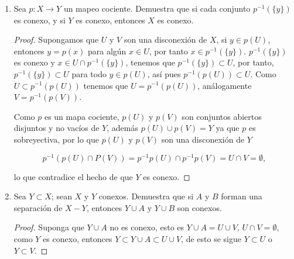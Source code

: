 \documentclass[11pt]{article}
\begin{document}
\begin{enumerate}
\begin{enumerate}
\begin{proof}
        \end{proof}
        
        \item Demuestra que la unión $Y$ de los espacios $X_K$ es conexa.
        
        \begin{proof}
            En efecto $a\in X_K$, $K\subset J$, $|K|\leq \infty$, entonces 

            $$\bigcup_{K} X_K 
                $$
                es conexo porque es unión de conexos que comparten un punto.
        \end{proof}

        \item Demuestra que $X$ es igual a la clausura de $Y$; concluye que $X$ es conexo.

        xd
    \end{enumerate}
    
    \item Sea $p : X \to Y$ un mapeo cociente. Demuestra que si cada conjunto $p^{-1}(\{y\})$ es conexo, y si $Y$ es conexo, entonces $X$ es conexo.
    
    \begin{proof}
    Supongamos que $U$ y $V$ son una disconexión de $X$, si $y \in p(U)$, entonces $y = p(x)$ para algún $x \in U$, por tanto $x \in p^{-1}(\{y\})$.  $p^{-1}(\{y\})$ es conexo y $x \in U \cap p^{-1}(\{y\})$, tenemos que $p^{-1}(\{y\}) \subset U$, por tanto, $p^{-1}(\{y\}) \subset U$ para todo $y \in p(U)$, así pues $p^{-1}(p(U)) \subset U$. Como $U \subset p^{-1}(p(U))$ tenemos que $U = p^{-1}(p(U))$, análogamente $V=p^{-1}(p(V))$.

  Como $p$ es un mapa cociente, $p(U)$ y $p(V)$ son conjuntos abiertos disjuntos y no vacíos de $Y$, además $p(U) \cup p(V) = Y$ ya que $p$ es sobreyectiva, por lo que $p(U)$ y $p(V)$ son una disconexión de $Y$

    $$p^{-1}(p(U)\cap P(V))=p^{-1}p(U)\cap p^{-1}p(V)=U\cap V=\emptyset,$$

  lo que contradice el hecho de que $Y$ es conexo. 
    \end{proof}

    \item Sea $Y \subset X$; sean $X$  y $Y$ conexos. Demuestra que si $A$ y $B$ forman una separación de $X - Y$, entonces $Y \cup A$ y $Y \cup B$ son conexos.

    \begin{proof}
        Suponga que $Y\cup A$ no es conexo, esto es $Y\cup A=U\cup V$, $U\cap V=\emptyset$, como $Y$ es conexo, entonces $Y\subset Y\cup A\subset U\cup V $, de esto se sigue $Y\subset U$ o $Y\subset V$.


\end{proof}
\end{enumerate}
\end{document}
